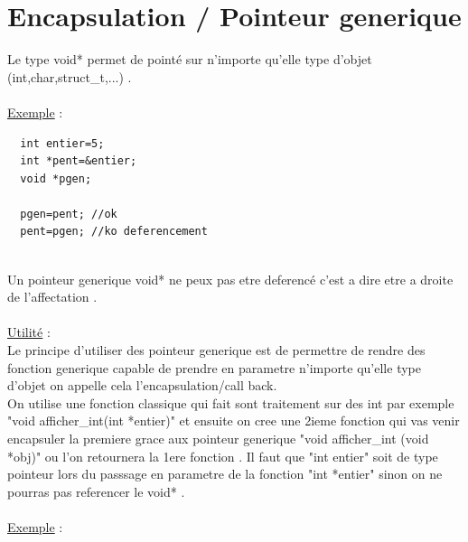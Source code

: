 \documentclass[a4paper,12pt,openany]{book}
\begin{document}
\section{Encapsulation / Pointeur generique}
Le type void* permet de pointé sur n'importe qu'elle type d'objet (int,char,struct\_t,...) .\\
\\
\underline{Exemple} : \\
\begin{verbatim}
  int entier=5;
  int *pent=&entier;
  void *pgen;

  pgen=pent; //ok
  pent=pgen; //ko deferencement 

\end{verbatim}
\\
Un pointeur generique void* ne peux pas etre deferencé c'est a dire etre a droite de l'affectation .\\
\\
\underline{Utilité} : \\
Le principe d'utiliser des pointeur generique est de permettre de rendre des fonction generique capable de prendre en parametre n'importe qu'elle type d'objet on appelle cela l'encapsulation/call back.\\
On utilise une fonction classique qui fait sont traitement sur des int par exemple "void afficher\_int(int *entier)" et ensuite on cree une 2ieme fonction qui vas venir encapsuler la premiere grace aux pointeur generique "void afficher\_int (void *obj)" ou l'on retournera la 1ere fonction .
Il faut que "int entier" soit de type pointeur lors du passsage en parametre de la fonction "int *entier" sinon on ne pourras pas referencer le void* .\\  
\\
\underline{Exemple} : \\
\end{document}
